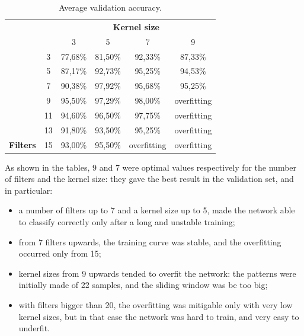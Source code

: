 \begin{table}[ht!]
	\centering
	\begin{tabular}{cccccc}
		&                                                 & \multicolumn{4}{c}{\textbf{Kernel size}} \\
		& \multicolumn{1}{c|}{}                           & 3                               & 5                               & 7                               & 9                                   \\ \cline{2-6} 
		& \multicolumn{1}{c|}{3}                          & 77,68\%                         & 81,50\%                         & 92,33\%                         & 87,33\%                             \\
		& \multicolumn{1}{c|}{\cellcolor[HTML]{EFEFEF}5}  & \cellcolor[HTML]{EFEFEF}87,17\% & \cellcolor[HTML]{EFEFEF}92,73\% & \cellcolor[HTML]{EFEFEF}95,25\% & \cellcolor[HTML]{EFEFEF}94,53\%     \\
		& \multicolumn{1}{c|}{7}                          & 90,38\%                         & 97,92\%                         & 95,68\%                         & 95,25\%                             \\
		& \multicolumn{1}{c|}{\cellcolor[HTML]{EFEFEF}9}  & \cellcolor[HTML]{EFEFEF}95,50\% & \cellcolor[HTML]{EFEFEF}97,29\% & \cellcolor[HTML]{EFEFEF}98,00\% & \cellcolor[HTML]{EFEFEF}overfitting \\
		& \multicolumn{1}{c|}{11}                         & 94,60\%                         & 96,50\%                         & 97,75\%                         & overfitting                         \\
		& \multicolumn{1}{c|}{\cellcolor[HTML]{EFEFEF}13} & \cellcolor[HTML]{EFEFEF}91,80\% & \cellcolor[HTML]{EFEFEF}93,50\% & \cellcolor[HTML]{EFEFEF}95,25\% & \cellcolor[HTML]{EFEFEF}overfitting \\
		\multirow{-7}{*}{\textbf{Filters}} & \multicolumn{1}{c|}{15}                         & 93,00\%                         & 95,50\%                         & overfitting                     & overfitting                        
	\end{tabular}
	\caption{Average validation accuracy.}
\end{table}
As shown in the tables, 9 and 7 were optimal values respectively for the number of filters and the kernel size: they gave the best result in the validation set, and in particular:
\begin{itemize}
	\item a number of filters up to 7 and a kernel size up to 5, made the network able to classify correctly only after a long and unstable training;
	\item from 7 filters upwards, the training curve was stable, and the overfitting occurred only from 15;
	\item kernel sizes from 9 upwards tended to overfit the network: the patterns were initially made of 22 samples, and the sliding window was be too big;
	\item with filters bigger than 20, the overfitting was mitigable only with very low kernel sizes, but in that case the network was hard to train, and very easy to underfit.
\end{itemize}
